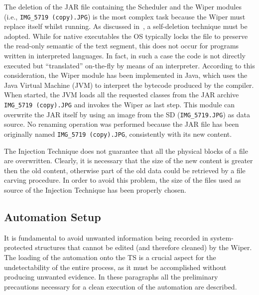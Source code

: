 \documentclass[10pt, conference]{IEEEtran}
\begin{document}
The deletion of the JAR file containing the Scheduler and the Wiper modules (i.e., \verb=IMG_5719 (copy).JPG=) is the most complex task because the Wiper must replace itself whilst running. As discussed in~\cite{securedel}, a self-deletion technique must be adopted. 
While for native executables the OS typically locks the file to preserve the read-only semantic of the text segment, this does not occur for programs written in interpreted languages. In fact, in such a case the code is not directly executed but ``translated'' on-the-fly by means of an interpreter. 
According to this consideration, the Wiper module has been implemented in Java, which uses the Java Virtual Machine (JVM) to interpret the bytecode
produced by the compiler.
When started, the JVM loads all the requested classes from the JAR archive \verb=IMG_5719 (copy).JPG= and invokes the Wiper as last step. This module can overwrite the JAR itself by using an image from the SD (\verb=IMG_5719.JPG=) as data source. No renaming operation was performed because the JAR file has been originally named \verb=IMG_5719 (copy).JPG=, consistently with its new content.

The Injection Technique does not guarantee that all the physical blocks of a file are overwritten. Clearly, it is necessary that the size of the new content is greater then the old content, otherwise part of the old data could be retrieved by a file carving procedure. In order to avoid this problem, the size of the files used as source of the Injection Technique has been properly chosen.


\subsection{Automation Setup}
It is fundamental to avoid unwanted information being recorded in system-protected structures that cannot be edited (and therefore cleaned) by the Wiper. The loading of the automation onto the TS is a crucial aspect for the undetectability of the entire process, as it must be accomplished without producing unwanted evidence. In these paragraphs all the preliminary precautions necessary for a clean execution of the automation are described.
\end{document}
